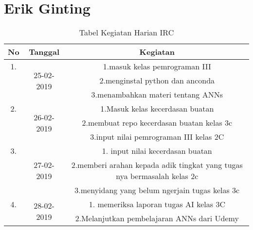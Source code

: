 \chapter{Erik Ginting}

\begin{table}[h]
\caption{Tabel Kegiatan Harian IRC}
\centering
\begin{tabular}{|c|c|c|}
\hline
No&Tanggal&Kegiatan\\
\hline
1.&\multirow{3}{*}{25-02-2019}&1.masuk kelas pemrograman III\\
&&2.menginstal python dan anconda\\
&&3.menambahkan materi tentang ANNs\\
\hline
2.&\multirow{3}{*}{26-02-2019}&1.Masuk kelas kecerdasan buatan\\
&&2.membuat repo kecerdasan buatan kelas 3c\\
&&3.input nilai pemrograman III kelas 2C\\
\hline
3.&\multirow{3}{*}{27-02-2019}&1. input nilai kecerdasan buatan\\
&&2.memberi arahan kepada adik tingkat yang tugas nya bermasalah kelas 2c\\
&&3.menyidang yang belum ngerjain tugas kelas 3c\\
\hline
4.&\multirow{2}{*}{28-02-2019}&1. memeriksa laporan tugas AI kelas 3C\\
&&2.Melanjutkan pembelajaran ANNs dari Udemy \\
\hline
\end{tabular}
\label{table:contoh}
\end{table}